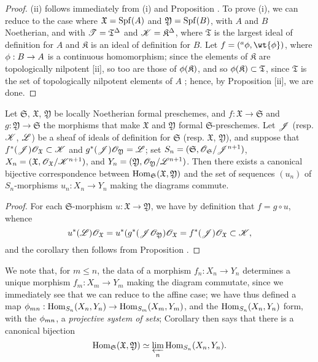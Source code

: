 \begin{proof}
\label{proof-1.10.6.10}
(ii) follows immediately from (i) and Proposition .
To prove (i), we can reduce to the case where $\mathfrak{X}=\operatorname{Spf}(A)$ and $\mathfrak{Y}=\operatorname{Spf}(B)$, with $A$ and $B$ Noetherian, and with $\mathscr{T}=\mathfrak{T}^\Delta$ and $\mathscr{K}=\mathfrak{K}^\Delta$, where $\mathfrak{T}$ is the largest ideal of definition for $A$ and $\mathfrak{K}$ is an ideal of definition for $B$.
Let $f=({}^a\vphi,\wt{\vphi})$, where $\vphi:B\to A$ is a continuous homomorphism; since the elements of $\mathfrak{K}$ are topologically nilpotent [ii], so too are those of $\phi(\mathfrak{K})$, and so $\phi(\mathfrak{K})\subset\mathfrak{T}$, since $\mathfrak{T}$ is the set of topologically nilpotent elements of $A$ ; hence, by Proposition [ii], we are done.
\end{proof}

\begin{corollary}[10.6.11]
\label{1.10.6.11}
Let $\mathfrak{S}$, $\mathfrak{X}$, $\mathfrak{Y}$ be locally Noetherian formal preschemes, and $f:\mathfrak{X}\to\mathfrak{S}$ and $g:\mathfrak{Y}\to\mathfrak{S}$ the morphisms that make $\mathfrak{X}$ and $\mathfrak{Y}$ formal $\mathfrak{S}$-preschemes.
Let $\mathscr{J}$ (resp. $\mathscr{K}$, $\mathscr{L}$) be a sheaf of ideals of definition for $\mathfrak{S}$ (resp. $\mathfrak{X}$, $\mathfrak{Y}$), and suppose that $f^*(\mathscr{J})\mathscr{O}_\mathfrak{X}\subset\mathscr{K}$ and $g^*(\mathscr{J})\mathscr{O}_\mathfrak{Y}=\mathscr{L}$; set $S_n=(\mathfrak{S},\mathscr{O}_\mathfrak{S}/\mathscr{J}^{n+1})$, $X_n=(\mathfrak{X},\mathscr{O}_\mathfrak{X}/\mathscr{K}^{n+1})$, and $Y_n=(\mathfrak{Y},\mathscr{O}_\mathfrak{Y}/\mathscr{L}^{n+1})$.
Then there exists a canonical bijective correspondence
between $\operatorname{Hom}_\mathfrak{S}(\mathfrak{X},\mathfrak{Y})$ and the set of sequences $(u_n)$ of $S_n$-morphisms $u_n:X_n\to Y_n$ making the diagrams  commute.
\end{corollary}

\begin{proof}
\label{proof-1.10.6.11}
For each $\mathfrak{S}$-morphism $u:\mathfrak{X}\to\mathfrak{Y}$, we have by definition that $f=g\circ u$, whence
\[
  u^*(\mathscr{L})\mathscr{O}_\mathfrak{X}=u^*(g^*(\mathscr{J}\mathscr{O}_\mathfrak{Y})\mathscr{O}_\mathfrak{X}=f^*(\mathscr{J})\mathscr{O}_\mathfrak{X}\subset\mathscr{K},
\]
and the corollary then follows from Proposition .
\end{proof}

We note that, for $m\leq n$, the data of a morphism $f_n:X_n\to Y_n$ determines a unique morphism $f_m:X_m\to Y_m$ making the diagram  commutate, since we immediately see that we can reduce to the affine case; we have thus defined a map $\vphi_{mn}:\Hom_{S_n}(X_n,Y_n)\to\Hom_{S_m}(X_m,Y_m)$, and the $\operatorname{Hom}_{S_n}(X_n,Y_n)$ form, with the $\phi_{mn}$, a \emph{projective system of sets}; Corollary  then says that there is a canonical bijection
\[
  \operatorname{Hom}_\mathfrak{S}(\mathfrak{X},\mathfrak{Y})\simeq\varprojlim_n\operatorname{Hom}_{S_n}(X_n,Y_n).
\]

